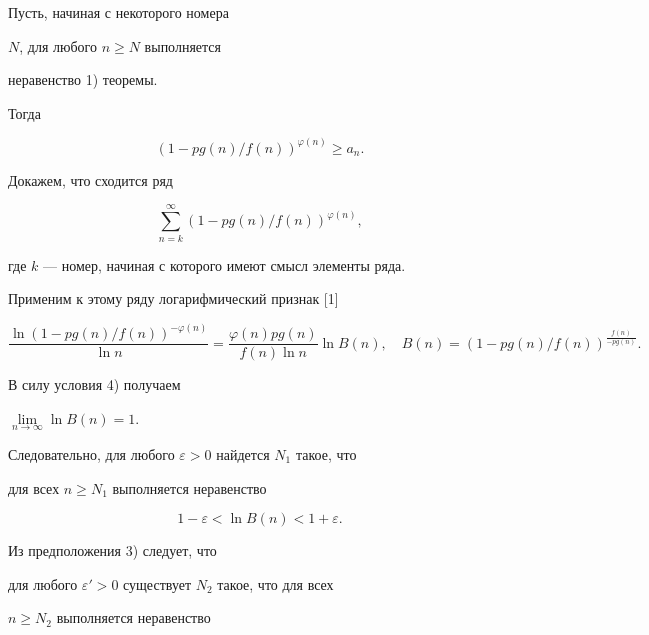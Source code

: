 \begin{pf}


Пусть, начиная с некоторого номера


$N$, для любого $ n \geq N$ выполняется


неравенство 1) теоремы.


Тогда


\begin{equation}


(1-p g(n)/f(n)) ^{ \varphi (n)}\geq a_n.


\end{equation}


Докажем, что сходится ряд


\begin{equation}


\sum_{n=k}^{\infty}


(1-p g(n)/f(n))^{\varphi (n)},


\end{equation}


где $k$ --- номер, начиная с которого \medskip имеют смысл элементы ряда.


Применим к этому ряду логарифмический признак [1]


\begin{equation}


\frac{\ln(1-p g(n)/f(n))^{-\varphi(n)}}{\ln n}


=\frac{\varphi(n) p g(n)}{f(n) \ln n} \ln B(n),\quad


B(n)=(1-p g(n)/f(n))^{\frac{f(n)}{-p g(n)}}.


\end{equation}


В силу условия 4) получаем


$\lim\limits_{n \to \infty}\ln B(n)=1$.


Следовательно, для любого $\varepsilon >0$ найдется $N_1$ такое, что


для всех $n \geq N_1$ выполняется неравенство


\begin{equation}


1-\varepsilon <\ln B(n)< 1+\varepsilon.


\end{equation}


Из предположения 3) следует, что


для любого $\varepsilon ' >0$ существует $N_2$ такое, что для всех


$n \geq N_2$ выполняется неравенство



\end{pf}
